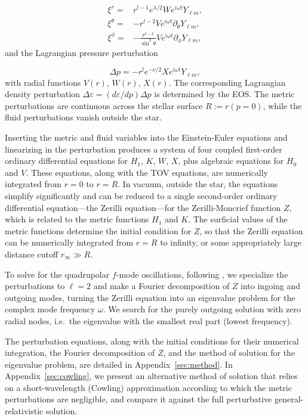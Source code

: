 \documentclass[aps,prd,twocolumn,superscriptaddress,footinbib]{revtex4-1}
\begin{document}
\begin{subequations}
\begin{align}
   \xi^{r} = &  r^{l-1}e^{\lambda/2} W e^{i \omega t} Y_{\ell m} , \\
   \xi^{\theta} = & -r^{l-2} V e^{i \omega t} \partial_{\theta} Y_{\ell m} , \\
   \xi^{\phi} = & -\frac{r^{l-2}}{\sin^2{\theta}}V e^{i \omega t} \partial_{\phi}Y_{\ell m} ,
\end{align}
\end{subequations}
and the Lagrangian pressure perturbation

\begin{equation}
    \Delta p = -r^l e^{-\nu/2} X e^{i \omega t} Y_{\ell m} ,
\end{equation}
with radial functions $V(r)$, $W(r)$, $X(r)$. The corresponding Lagrangian density perturbation $\Delta \varepsilon = (d\varepsilon/dp) \Delta p$ is determined by the EOS. The metric perturbations are continuous across the stellar surface $R := r(p=0)$, while the fluid perturbations vanish outside the star.

Inserting the metric and fluid variables into the Einstein-Euler equations and linearizing in the perturbation produces a system of four coupled first-order ordinary differential equations for $H_1$, $K$, $W$, $X$, plus algebraic equations for $H_0$ and $V$. These equations, along with the TOV equations, are numerically integrated from $r=0$ to $r=R$. In vacuum, outside the star, the equations simplify significantly and can be reduced to a single second-order ordinary differential equation---the Zerilli equation---for the Zerilli-Moncrief function $Z$, which is related to the metric functions $H_1$ and $K$. The surficial values of the metric functions determine the initial condition for $Z$, so that the Zerilli equation can be numerically integrated from $r=R$ to infinity, or some appropriately large distance cutoff $r_\infty \gg R$.

To solve for the quadrupolar $f$-mode oscillations, following \cite{lindblom1983quadrupole, 1985}, we specialize the perturbations to $\ell = 2$ and make a Fourier decomposition of $Z$ into ingoing and outgoing modes, turning the Zerilli equation into an eigenvalue problem for the complex mode frequency $\omega$. We search for the purely outgoing solution with zero radial nodes, i.e.~the eigenvalue with the smallest real part (lowest frequency).

The perturbation equations, along with the initial conditions for their numerical integration, the Fourier decomposition of $Z$, and the method of solution for the eigenvalue problem, are detailed in Appendix~\ref{sec:method}. In Appendix~\ref{sec:cowling}, we present an alternative method of solution that relies on a short-wavelength (Cowling) approximation according to which the metric perturbations are negligible, and compare it against the full perturbative general-relativistic solution. 
\end{document}
